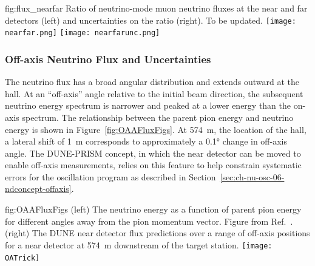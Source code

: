 \begin{dunefigure}{fig:flux_nearfar}
{Ratio of neutrino-mode muon neutrino fluxes at the near and far detectors (left) and uncertainties on the ratio (right).  To be updated. }
    \texttt{[image: nearfar.png]}
     \texttt{[image: nearfarunc.png]}
\end{dunefigure}

\subsubsection{Off-axis Neutrino Flux and Uncertainties}



The neutrino flux has a broad angular distribution and extends outward at the  hall. At an ``off-axis'' angle relative to the initial beam direction, the subsequent neutrino energy spectrum is narrower and peaked at a lower energy than the on-axis spectrum.
The relationship between the parent pion energy and neutrino energy is shown in Figure~\ref{fig:OAAFluxFigs}.  At \SI{574}{m}, the location of the  hall, a lateral shift of \SI{1}{m} corresponds to approximately a \ang{0.1} change in off-axis angle. 
The DUNE-PRISM concept, in which the near detector \lartpc can be moved to enable  off-axis measurements, relies on this feature to help constrain systematic errors for the  oscillation program as described in Section~\ref{sec:ch-nu-osc-06-ndconcept-offaxis}.

\begin{dunefigure} %
{fig:OAAFluxFigs}
{(left) The neutrino energy as a function of parent pion energy for different angles away from the pion momentum vector. Figure from Ref.~\cite{Duffy:2016owt}. (right) The DUNE near detector flux predictions over a range of off-axis positions for a near detector at \SI{574}{m} downstream of the target station. }
    \texttt{[image: OATrick]}
\end{dunefigure}

